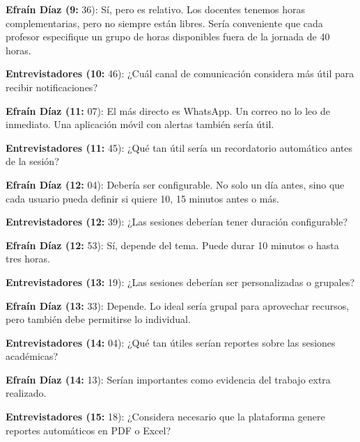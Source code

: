 \noindent\textbf{Efraín Díaz (9:} 36): Sí, pero es relativo. Los docentes tenemos horas complementarias, pero no siempre están libres. Sería conveniente que cada profesor especifique un grupo de horas disponibles fuera de la jornada de 40 horas.\par\smallskip

\noindent\textbf{Entrevistadores (10:} 46): ¿Cuál canal de comunicación considera más útil para recibir notificaciones?\par\smallskip

\noindent\textbf{Efraín Díaz (11:} 07): El más directo es WhatsApp. Un correo no lo leo de inmediato. Una aplicación móvil con alertas también sería útil.\par\smallskip

\noindent\textbf{Entrevistadores (11:} 45): ¿Qué tan útil sería un recordatorio automático antes de la sesión?\par\smallskip

\noindent\textbf{Efraín Díaz (12:} 04): Debería ser configurable. No solo un día antes, sino que cada usuario pueda definir si quiere 10, 15 minutos antes o más.\par\smallskip

\noindent\textbf{Entrevistadores (12:} 39): ¿Las sesiones deberían tener duración configurable?\par\smallskip

\noindent\textbf{Efraín Díaz (12:} 53): Sí, depende del tema. Puede durar 10 minutos o hasta tres horas.\par\smallskip

\noindent\textbf{Entrevistadores (13:} 19): ¿Las sesiones deberían ser personalizadas o grupales?\par\smallskip

\noindent\textbf{Efraín Díaz (13:} 33): Depende. Lo ideal sería grupal para aprovechar recursos, pero también debe permitirse lo individual.\par\smallskip

\noindent\textbf{Entrevistadores (14:} 04): ¿Qué tan útiles serían reportes sobre las sesiones académicas?\par\smallskip

\noindent\textbf{Efraín Díaz (14:} 13): Serían importantes como evidencia del trabajo extra realizado.\par\smallskip

\noindent\textbf{Entrevistadores (15:} 18): ¿Considera necesario que la plataforma genere reportes automáticos en PDF o Excel?\par\smallskip

